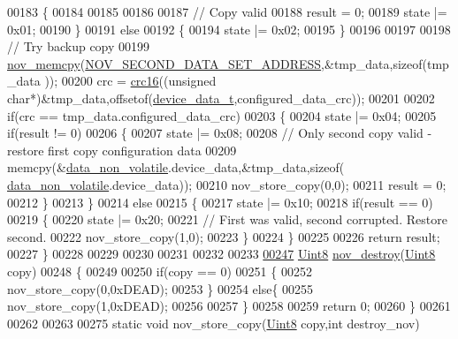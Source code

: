 \begin{DoxyCode}
00183     \{
00184 
00185      
00186 
00187         \textcolor{comment}{// Copy valid}
00188         result = 0;
00189         state |= 0x01;
00190     \}
00191     \textcolor{keywordflow}{else}
00192     \{
00194         state |= 0x02;
00195     \}
00196 
00197 
00198    \textcolor{comment}{//   Try backup copy}
00199       \hyperlink{a00060_a3ff681f3af83ec441535611dac6ada16}{nov\_memcpy}(\hyperlink{a00029_ab062741a69ee7156fbdf317ec627b4ca}{NOV\_SECOND\_DATA\_SET\_ADDRESS},&tmp\_data,\textcolor{keyword}{sizeof}(tmp\_data
      ));
00200       crc = \hyperlink{a00060_a6553827687db2137ee550ad6e1d2f316}{crc16}((\textcolor{keywordtype}{unsigned} \textcolor{keywordtype}{char}*)&tmp\_data,offsetof(\hyperlink{a00022_a95029dff9c90f6a6907353ba86eb3f33}{device\_data\_t},configured\_data\_crc));
00201 
00202     \textcolor{keywordflow}{if}(crc == tmp\_data.configured\_data\_crc)
00203     \{
00204         state |= 0x04;
00205         \textcolor{keywordflow}{if}(result != 0)
00206         \{
00207             state |= 0x08;
00208             \textcolor{comment}{// Only second copy valid - restore first copy configuration data}
00209              memcpy(&\hyperlink{a00060_a76ac5f917f5308dcd83de0d7c94559fb}{data\_non\_volatile}.device\_data,&tmp\_data,\textcolor{keyword}{sizeof}(
      \hyperlink{a00060_a76ac5f917f5308dcd83de0d7c94559fb}{data\_non\_volatile}.device\_data));
00210              nov\_store\_copy(0,0);
00211              result = 0;
00212         \}
00213     \}
00214     \textcolor{keywordflow}{else}
00215     \{
00217         state |= 0x10;
00218         \textcolor{keywordflow}{if}(result == 0)
00219         \{
00220             state |= 0x20;
00221             \textcolor{comment}{// First was valid, second corrupted. Restore second.}
00222              nov\_store\_copy(1,0);
00223         \}
00224     \}
00225 
00226     \textcolor{keywordflow}{return} result;
00227 \}
00228 
00229 
00230 
00231 
00232 
00233 
\hypertarget{a00060_source_l00247}{}\hyperlink{a00060_aeb181884e4c104cd984afdd6eb2a2782}{00247} \hyperlink{a00072_af84840501dec18061d18a68c162a8fa2}{Uint8} \hyperlink{a00060_aeb181884e4c104cd984afdd6eb2a2782}{nov\_destroy}(\hyperlink{a00072_af84840501dec18061d18a68c162a8fa2}{Uint8} copy)
00248 \{
00249 
00250     \textcolor{keywordflow}{if}(copy == 0)
00251     \{
00252          nov\_store\_copy(0,0xDEAD);
00253     \}
00254     \textcolor{keywordflow}{else}\{
00255          nov\_store\_copy(1,0xDEAD);
00256 
00257     \}
00258        
00259     \textcolor{keywordflow}{return} 0;
00260 \}
00261 
00262 
00263 
00275 \textcolor{keyword}{static} \textcolor{keywordtype}{void} nov\_store\_copy(\hyperlink{a00072_af84840501dec18061d18a68c162a8fa2}{Uint8} copy,\textcolor{keywordtype}{int} destroy\_nov)

\end{DoxyCode}

